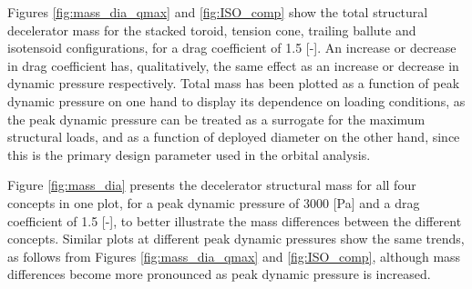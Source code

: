 
Figures \ref{fig:mass_dia_qmax} and \ref{fig:ISO_comp} show the total structural decelerator mass for the stacked toroid, tension cone, trailing ballute and isotensoid configurations, for a drag coefficient of 1.5 [-]. An increase or decrease in drag coefficient has, qualitatively, the same effect as an increase or decrease in dynamic pressure respectively. Total mass has been plotted as a function of peak dynamic pressure on one hand to display its dependence on loading conditions, as the peak dynamic pressure can be treated as a surrogate for the maximum structural loads, and as a function of deployed diameter on the other hand, since this is the primary design parameter used in the orbital analysis. 

Figure \ref{fig:mass_dia} presents the decelerator structural mass for all four concepts in one plot, for a peak dynamic pressure of 3000 [Pa] and a drag coefficient of 1.5 [-], to better illustrate the mass differences between the different concepts. Similar plots at different peak dynamic pressures show the same trends, as follows from Figures \ref{fig:mass_dia_qmax} and \ref{fig:ISO_comp}, although mass differences become more pronounced as peak dynamic pressure is increased.


